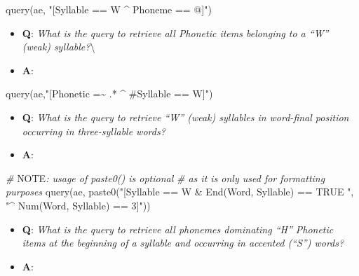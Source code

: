 \documentclass[
]{book}
\newenvironment{Shaded}{\begin{snugshade}}{\end{snugshade}}
\newcommand{\AlertTok}[1]{\textcolor[rgb]{0.94,0.16,0.16}{#1}}
\newcommand{\CommentTok}[1]{\textcolor[rgb]{0.56,0.35,0.01}{\textit{#1}}}
\newcommand{\FunctionTok}[1]{\textcolor[rgb]{0.00,0.00,0.00}{#1}}
\newcommand{\NormalTok}[1]{#1}
\newcommand{\StringTok}[1]{\textcolor[rgb]{0.31,0.60,0.02}{#1}}
\providecommand{\tightlist}{%
  \setlength{\itemsep}{0pt}\setlength{\parskip}{0pt}}
\begin{document}
\begin{Shaded}
\begin{Highlighting}[]
\FunctionTok{query}\NormalTok{(ae, }\StringTok{"[Syllable == W \^{} Phoneme == @]"}\NormalTok{)}
\end{Highlighting}
\end{Shaded}

\begin{itemize}
\tightlist
\item
  \textbf{Q}: \emph{What is the query to retrieve all Phonetic items belonging to a ``W'' (weak) syllable?}\textbackslash{}
\item
  \textbf{A}:
\end{itemize}

\begin{Shaded}
\begin{Highlighting}[]
\FunctionTok{query}\NormalTok{(ae,}\StringTok{"[Phonetic =\textasciitilde{} .* \^{} \#Syllable == W]"}\NormalTok{)}
\end{Highlighting}
\end{Shaded}

\begin{itemize}
\tightlist
\item
  \textbf{Q}: \emph{What is the query to retrieve ``W'' (weak) syllables in word-final position occurring in three-syllable words?}
\item
  \textbf{A}:
\end{itemize}

\begin{Shaded}
\begin{Highlighting}[]
\CommentTok{\# }\AlertTok{NOTE}\CommentTok{: usage of paste0() is optional}
\CommentTok{\# as it is only used for formatting purposes}
\FunctionTok{query}\NormalTok{(ae, }\FunctionTok{paste0}\NormalTok{(}\StringTok{"[Syllable == W \& End(Word, Syllable) == TRUE "}\NormalTok{,}
                 \StringTok{"\^{} Num(Word, Syllable) == 3]"}\NormalTok{))}
\end{Highlighting}
\end{Shaded}

\begin{itemize}
\tightlist
\item
  \textbf{Q}: \emph{What is the query to retrieve all phonemes dominating ``H'' Phonetic items at the beginning of a syllable and occurring in accented (``S'') words?}
\item
  \textbf{A}:
\end{itemize}
\end{document}
